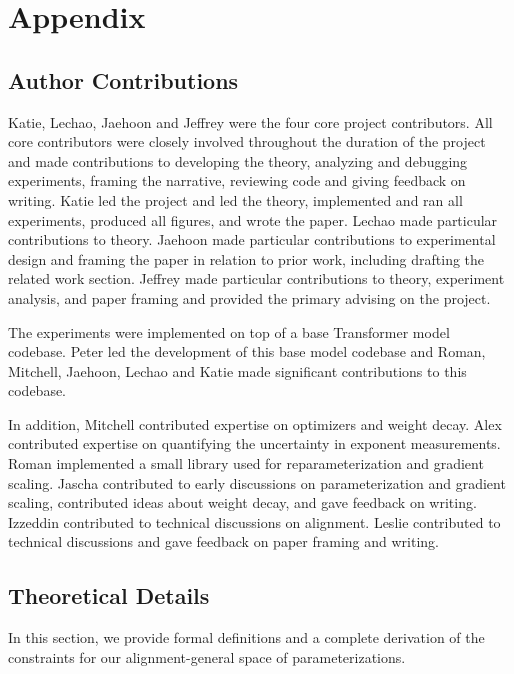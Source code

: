\newpage
\setcounter{section}{0}

\appendix
\onecolumn
\appendix
{}
\section*{Appendix}\label{sec:appendix}
\setcounter{section}{0}
\renewcommand{\thesubsection}{\Alph{subsection}}

\renewcommand\thefigure{\thesubsection\arabic{figure}}
\renewcommand\thetable{\thesubsection\arabic{table}}

\subsection{Author Contributions}
Katie, Lechao, Jaehoon and Jeffrey were the four core project contributors. All core contributors were closely involved throughout the duration of the project and made contributions to developing the theory, analyzing and debugging experiments, framing the narrative, reviewing code and giving feedback on writing. Katie led the project and led the theory, implemented and ran all experiments, produced all figures, and wrote the paper. Lechao made particular contributions to theory. Jaehoon made particular contributions to experimental design and framing the paper in relation to prior work, including drafting the related work section. Jeffrey made particular contributions to theory, experiment analysis, and paper framing and provided the primary advising on the project.

The experiments were implemented on top of a base Transformer model codebase. Peter led the development of this base model codebase and Roman, Mitchell, Jaehoon, Lechao and Katie made significant contributions to this codebase.

In addition, Mitchell contributed expertise on optimizers and weight decay. Alex contributed expertise on quantifying the uncertainty in exponent measurements. Roman implemented a small library used for reparameterization and gradient scaling. Jascha contributed to early discussions on parameterization and gradient scaling, contributed ideas about weight decay, and gave feedback on writing. Izzeddin contributed to technical discussions on alignment. Leslie contributed to technical discussions and gave feedback on paper framing and writing.

\subsection{Theoretical Details}
\label{app:theory}
In this section, we provide formal definitions and a complete derivation of the constraints for our alignment-general space of parameterizations.

